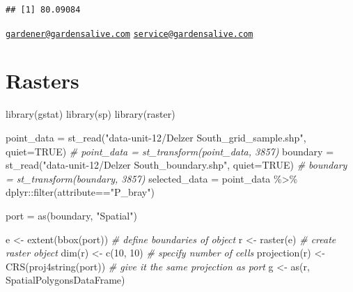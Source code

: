 \documentclass[
]{book}
\newenvironment{Shaded}{\begin{snugshade}}{\end{snugshade}}
\newcommand{\AttributeTok}[1]{\textcolor[rgb]{0.77,0.63,0.00}{#1}}
\newcommand{\CommentTok}[1]{\textcolor[rgb]{0.56,0.35,0.01}{\textit{#1}}}
\newcommand{\ConstantTok}[1]{\textcolor[rgb]{0.00,0.00,0.00}{#1}}
\newcommand{\DecValTok}[1]{\textcolor[rgb]{0.00,0.00,0.81}{#1}}
\newcommand{\FunctionTok}[1]{\textcolor[rgb]{0.00,0.00,0.00}{#1}}
\newcommand{\NormalTok}[1]{#1}
\newcommand{\OtherTok}[1]{\textcolor[rgb]{0.56,0.35,0.01}{#1}}
\newcommand{\SpecialCharTok}[1]{\textcolor[rgb]{0.00,0.00,0.00}{#1}}
\newcommand{\StringTok}[1]{\textcolor[rgb]{0.31,0.60,0.02}{#1}}
\begin{document}
\begin{verbatim}
## [1] 80.09084
\end{verbatim}

\href{mailto:gardener@gardensalive.com}{\nolinkurl{gardener@gardensalive.com}}
\href{mailto:service@gardensalive.com}{\nolinkurl{service@gardensalive.com}}

\hypertarget{rasters}{%
\section{Rasters}\label{rasters}}

\begin{Shaded}
\begin{Highlighting}[]
\FunctionTok{library}\NormalTok{(gstat)}
\FunctionTok{library}\NormalTok{(sp)}
\FunctionTok{library}\NormalTok{(raster)}

\NormalTok{point\_data }\OtherTok{=} \FunctionTok{st\_read}\NormalTok{(}\StringTok{"data{-}unit{-}12/Delzer South\_grid\_sample.shp"}\NormalTok{, }\AttributeTok{quiet=}\ConstantTok{TRUE}\NormalTok{)}
\CommentTok{\# point\_data = st\_transform(point\_data, 3857)}
\NormalTok{boundary }\OtherTok{=} \FunctionTok{st\_read}\NormalTok{(}\StringTok{"data{-}unit{-}12/Delzer South\_boundary.shp"}\NormalTok{, }\AttributeTok{quiet=}\ConstantTok{TRUE}\NormalTok{)}
\CommentTok{\# boundary = st\_transform(boundary, 3857)}
\NormalTok{selected\_data }\OtherTok{=}\NormalTok{ point\_data }\SpecialCharTok{\%\textgreater{}\%}
\NormalTok{  dplyr}\SpecialCharTok{::}\FunctionTok{filter}\NormalTok{(attribute}\SpecialCharTok{==}\StringTok{"P\_bray"}\NormalTok{)}


\NormalTok{port }\OtherTok{=} \FunctionTok{as}\NormalTok{(boundary, }\StringTok{"Spatial"}\NormalTok{)}

\NormalTok{e }\OtherTok{\textless{}{-}} \FunctionTok{extent}\NormalTok{(}\FunctionTok{bbox}\NormalTok{(port))                  }\CommentTok{\# define boundaries of object}
\NormalTok{r }\OtherTok{\textless{}{-}} \FunctionTok{raster}\NormalTok{(e)                           }\CommentTok{\# create raster object }
\FunctionTok{dim}\NormalTok{(r) }\OtherTok{\textless{}{-}} \FunctionTok{c}\NormalTok{(}\DecValTok{10}\NormalTok{, }\DecValTok{10}\NormalTok{)                      }\CommentTok{\# specify number of cells}
\FunctionTok{projection}\NormalTok{(r) }\OtherTok{\textless{}{-}} \FunctionTok{CRS}\NormalTok{(}\FunctionTok{proj4string}\NormalTok{(port))  }\CommentTok{\# give it the same projection as port}
\NormalTok{g }\OtherTok{\textless{}{-}} \FunctionTok{as}\NormalTok{(r, }\StringTok{\textquotesingle{}SpatialPolygonsDataFrame\textquotesingle{}}\NormalTok{) }


\end{Highlighting}
\end{Shaded}
\end{document}
